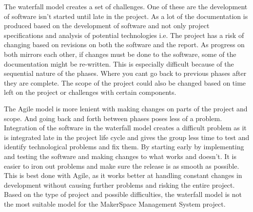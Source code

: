 The waterfall model creates a set of challenges. One of these are the development of software isn't started until late in the project. As a lot of the documentation is produced based on the development of software and not only project specifications and analysis of potential technologies i.e. The project has a risk of changing based on revisions on both the software and the report. As progress on both mirrors each other, if changes must be done to the software, some of the documentation might be re-written. This is especially difficult because of the sequential nature of the phases. Where you cant go back to previous phases after they are complete. The scope of the project could also be changed based on time left on the project or challenges with certain components. 

The Agile model is more lenient with making changes on parts of the project and scope. And going back and forth between phases poses less of a problem. Integration of the software in the waterfall model creates a difficult problem as it is integrated late in the project life cycle and gives the group less time to test and identify technological problems and fix them\cite{Waterfall_Model:_What_is_it}. By starting early by implementing and testing the software and making changes to what works and doesn't. It is easier to iron out problems and make sure the release is as smooth as possible. This is best done with Agile, as it works better at handling constant changes in development without causing further problems and risking the entire project. Based on the type of project and possible difficulties, the waterfall model is not the most suitable model for the MakerSpace Management System project.

